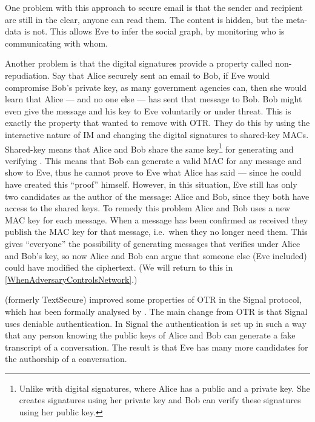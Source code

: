 One problem with this approach to secure email is that the sender and recipient
are still in the clear, anyone can read them.
The content is hidden, but the meta-data is not.
This allows Eve to infer the social graph, by monitoring who is communicating 
with whom.

Another problem is that the digital signatures provide a property called 
non-repudiation.
Say that Alice securely sent an email to Bob, if Eve would compromise Bob's 
private key, as many government agencies can, then she would learn that Alice 
--- and no one else --- has sent that message to Bob.
Bob might even give the message and his key to Eve voluntarily or under threat.
This is exactly the property that \citeauthor{otr2004} wanted to remove with 
\ac{OTR}.
They do this by using the interactive nature of \ac{IM} and changing the 
digital signatures to shared-key \acp{MAC}.
Shared-key means that Alice and Bob share the same key\footnote{%
  Unlike with digital signatures, where Alice has a public and a private key.
  She creates signatures using her private key and Bob can verify these 
  signatures using her public key.
} for generating and verifying .
This means that Bob can generate a valid \ac{MAC} for any message and show to 
Eve, thus he cannot prove to Eve what Alice has said --- since he could have 
created this \enquote{proof} himself.
However, in this situation, Eve still has only two candidates as the author of 
the message: Alice and Bob, since they both have access to the shared keys.
To remedy this problem Alice and Bob uses a new \ac{MAC} key for each message.
When a message has been confirmed as received they publish the \ac{MAC} key for 
that message, i.e.\ when they no longer need them.
This gives \enquote{everyone} the possibility of generating messages that 
verifies under Alice and Bob's key, so now Alice and Bob can argue that someone 
else (Eve included) could have modified the ciphertext.
(We will return to this in \cref{WhenAdversaryControlsNetwork}.)

\textcite{SignalApp} (formerly TextSecure) improved some properties of \ac{OTR} 
in the Signal protocol, which has been formally analysed by 
\textcite{TextSecureAnalysis,SignalProtocolAnalysis}.
The main change from \ac{OTR} is that Signal uses deniable authentication.
In Signal the authentication is set up in such a way that any person knowing 
the public keys of Alice and Bob can generate a fake transcript of 
a conversation.
The result is that Eve has many more candidates for the authorship of 
a conversation.


